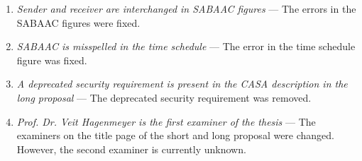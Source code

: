 \begin{enumerate}[label=R\arabic*.]
\begin{enumerate}[label=Q\arabic*.]
        \item \textit{Sender and receiver are interchanged in SABAAC figures} --- The errors in the SABAAC figures were fixed.
        \item \textit{SABAAC is misspelled in the time schedule} --- The error in the time schedule figure was fixed.
        \item \textit{A deprecated security requirement is present in the CASA description in the long proposal} --- The deprecated security requirement was removed.
        \item \textit{Prof. Dr. Veit Hagenmeyer is the first examiner of the thesis} --- The examiners on the title page of the short and long proposal were changed. However, the second examiner is currently unknown.
    \end{enumerate}
\end{enumerate}
